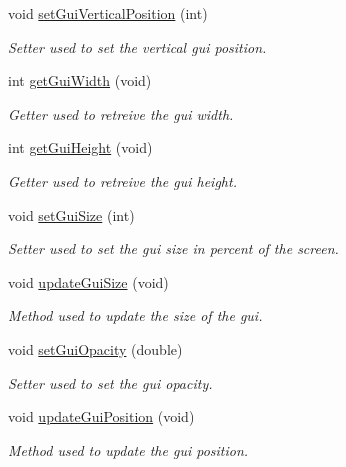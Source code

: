 \begin{DoxyCompactItemize}
void \mbox{\hyperlink{class_autoscope_picture_window_form_a687966c09f4fe03caa2b52c42a804ae1}{set\+Gui\+Vertical\+Position}} (int)
\begin{DoxyCompactList}\small\item\em Setter used to set the vertical gui position. \end{DoxyCompactList}\item 
int \mbox{\hyperlink{class_autoscope_picture_window_form_a7e8d04d5bf4eafc415a9d6176a2325e9}{get\+Gui\+Width}} (void)
\begin{DoxyCompactList}\small\item\em Getter used to retreive the gui width. \end{DoxyCompactList}\item 
int \mbox{\hyperlink{class_autoscope_picture_window_form_ad3fa8efcfcc0631f8b646500fb5cea65}{get\+Gui\+Height}} (void)
\begin{DoxyCompactList}\small\item\em Getter used to retreive the gui height. \end{DoxyCompactList}\item 
void \mbox{\hyperlink{class_autoscope_picture_window_form_ae968436e14e51184ca0f375f04947d4c}{set\+Gui\+Size}} (int)
\begin{DoxyCompactList}\small\item\em Setter used to set the gui size in percent of the screen. \end{DoxyCompactList}\item 
void \mbox{\hyperlink{class_autoscope_picture_window_form_a8c0ca53b5ca0a741cf240a0c07870bfe}{update\+Gui\+Size}} (void)
\begin{DoxyCompactList}\small\item\em Method used to update the size of the gui. \end{DoxyCompactList}\item 
void \mbox{\hyperlink{class_autoscope_picture_window_form_acb47c88be96f7b6573cd6181d6e3865e}{set\+Gui\+Opacity}} (double)
\begin{DoxyCompactList}\small\item\em Setter used to set the gui opacity. \end{DoxyCompactList}\item 
void \mbox{\hyperlink{class_autoscope_picture_window_form_aa9b0990a5e7fa9d0bedeaab959b999c6}{update\+Gui\+Position}} (void)
\begin{DoxyCompactList}\small\item\em Method used to update the gui position. \end{DoxyCompactList}\item 

\end{DoxyCompactItemize}
